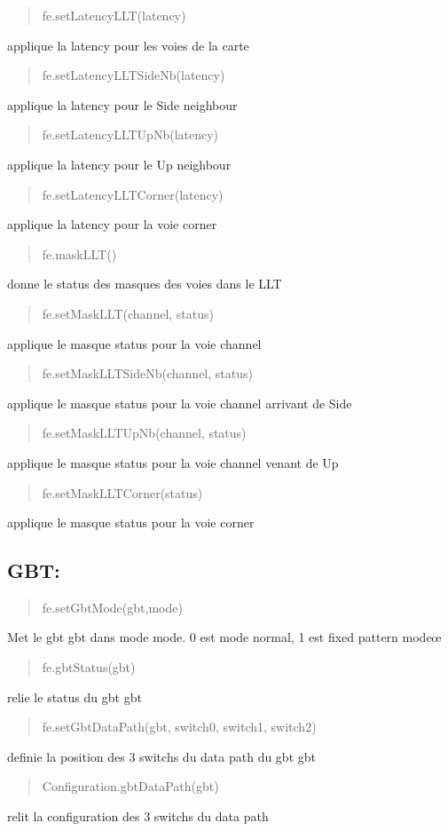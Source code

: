 \begin{quote}
fe.\+set\+Latency\+L\+L\+T(latency) \end{quote}
applique la latency pour les voies de la carte

\begin{quote}
fe.\+set\+Latency\+L\+L\+T\+Side\+Nb(latency) \end{quote}
applique la latency pour le Side neighbour

\begin{quote}
fe.\+set\+Latency\+L\+L\+T\+Up\+Nb(latency) \end{quote}
applique la latency pour le Up neighbour

\begin{quote}
fe.\+set\+Latency\+L\+L\+T\+Corner(latency) \end{quote}
applique la latency pour la voie corner

\begin{quote}
fe.\+mask\+L\+L\+T() \end{quote}
donne le status des masques des voies dans le L\+LT

\begin{quote}
fe.\+set\+Mask\+L\+L\+T(channel, status) \end{quote}
applique le masque status pour la voie channel

\begin{quote}
fe.\+set\+Mask\+L\+L\+T\+Side\+Nb(channel, status) \end{quote}
applique le masque status pour la voie channel arrivant de Side

\begin{quote}
fe.\+set\+Mask\+L\+L\+T\+Up\+Nb(channel, status) \end{quote}
applique le masque status pour la voie channel venant de Up

\begin{quote}
fe.\+set\+Mask\+L\+L\+T\+Corner(status) \end{quote}
applique le masque status pour la voie corner

\subsection*{G\+BT\+: }

\begin{quote}
fe.\+set\+Gbt\+Mode(gbt,mode) \end{quote}
Met le gbt \textquotesingle{}gbt\textquotesingle{} dans mode \textquotesingle{}mode\textquotesingle{}. 0 est mode normal, 1 est fixed pattern modeœ

\begin{quote}
fe.\+gbt\+Status(gbt) \end{quote}
relie le status du gbt \textquotesingle{}gbt\textquotesingle{}

\begin{quote}
fe.\+set\+Gbt\+Data\+Path(gbt, switch0, switch1, switch2) \end{quote}
definie la position des 3 switchs du data path du gbt gbt

\begin{quote}
Configuration.\+gbt\+Data\+Path(gbt) \end{quote}
relit la configuration des 3 switchs du data path 